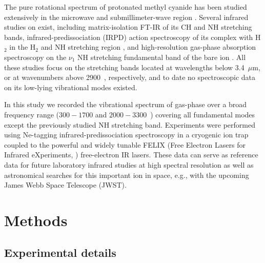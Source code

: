 The pure rotational spectrum of protonated methyl cyanide has been studied extensively in the microwave \cite{GAM2000} and submillimeter-wave region \cite{AHH2006}.
Several infrared studies on \pa exist, including matrix-isolation FT-IR \cite{Frankowski2005} of its CH and NH stretching bands, infrared-predissociation (IRPD) action spectroscopy of its complex with H$_2$ in the H$_2$ and NH stretching region \cite{DRO1999}, and high-resolution gas-phase absorption spectroscopy on the $\nu_1$ NH stretching fundamental band of the bare ion \cite{Amano1988, Amano1992}. All these studies focus on the stretching bands located at wavelengths below 3.4~$\mu$m, or at wavenumbers above 2900~\wn, respectively, and to date no spectroscopic data on its low-lying vibrational modes existed.

In this study we recorded the vibrational spectrum of gas-phase \pa over a broad frequency range  ($300-1700$ and $2000-3300$~\wnn) covering all fundamental modes except the previously studied NH stretching band. Experiments were performed using Ne-tagging infrared-predissociation spectroscopy in a cryogenic ion trap coupled to the powerful and widely tunable FELIX (Free Electron Lasers for Infrared eXperiments, \cite{oepts_free-electron-laser_1995}) free-electron IR lasers. These data can serve as reference data for future laboratory infrared studies at high spectral resolution as well as astronomical searches for this important ion in space, e.g., with the upcoming James Webb Space Telescope (JWST). 


\section{Methods}

\subsection{Experimental details}

